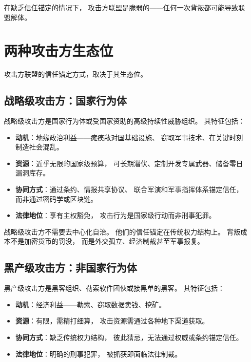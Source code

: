 \documentclass[11pt,a4paper]{article}
\begin{document}
在缺乏信任锚定的情况下，
攻击方联盟是脆弱的——任何一次背叛都可能导致联盟解体。

\section{两种攻击方生态位}

攻击方联盟的信任锚定方式，取决于其生态位。

\subsection{战略级攻击方：国家行为体}

战略级攻击方是国家行为体或受国家资助的高级持续性威胁组织。
其特征包括：
\begin{itemize}
    \item \textbf{动机}：地缘政治利益——瘫痪敌对国基础设施、
          窃取军事技术、在关键时刻制造社会混乱。
    \item \textbf{资源}：近乎无限的国家级预算，
          可长期潜伏、定制开发专属武器、储备零日漏洞库存。
    \item \textbf{协同方式}：通过条约、情报共享协议、
          联合军演和军事指挥体系锚定信任，
          而非通过密码学或区块链。
    \item \textbf{法律地位}：享有主权豁免，
          攻击行为是国家级行动而非刑事犯罪。
\end{itemize}

战略级攻击方不需要去中心化自治。
他们的信任锚定在传统权力结构上。
背叛成本不是加密货币的罚没，
而是外交孤立、经济制裁甚至军事报复。

\subsection{黑产级攻击方：非国家行为体}

黑产级攻击方是黑客组织、勒索软件团伙或接黑单的黑客。
其特征包括：
\begin{itemize}
    \item \textbf{动机}：经济利益——勒索、窃取数据卖钱、挖矿。
    \item \textbf{资源}：有限，需精打细算，
          攻击资源需通过各种地下渠道获取。
    \item \textbf{协同方式}：缺乏传统权力结构，
          彼此猜忌，无法通过权威或条约锚定信任。
    \item \textbf{法律地位}：明确的刑事犯罪，
          被抓获即面临法律制裁。
\end{itemize}
\end{document}
